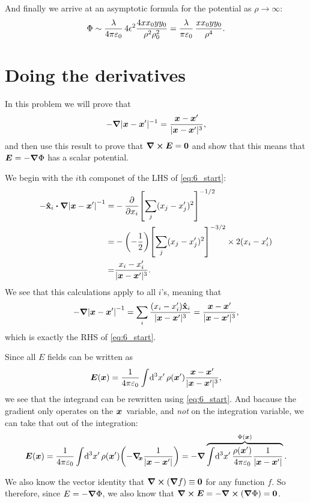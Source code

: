 \documentclass[11pt,letter, swedish, english
]{article}
\let\oldint\int
\renewcommand{\int}{\oldint\limits}
\newcommand{\enaught}{\ensuremath\varepsilon_0}
\begin{document}
And finally we arrive at an asymptotic formula for the potential as
$\rho\to\infty$:
\begin{equation}
\Phi\sim \frac{\lambda}{4\pi\enaught}\,
4\epsilon^2\frac{4xx_0yy_0}{\rho^2\rho_0^2}
=\frac{\lambda}{\pi\enaught}\,\frac{xx_0yy_0}{\rho^4}.
\end{equation}




\section{Doing the derivatives}
In this problem we will prove that
\begin{equation}\label{eq:6_start}
-\grad|\vb*x-\vb*x'|^{-1}
=\frac{\vb*x-\vb*x'}{|\vb*x-\vb*x'|^{3}},
\end{equation}
and then use this result to prove that $\curl\vb*E=\vb0$ and show that
this means that $\vb*E=-\grad\Phi$ has a scalar potential.

We begin with the $i$th componet of the LHS of \eqref{eq:6_start}:
\begin{equation}
\begin{aligned}
-\vu{x}_i\vdot\grad\qty|\vb*x-\vb*x'|^{-1}
=&-\pdv{x_i}\qty[\sum_j(x_j-x_j')^2]^{-1/2}\\
=&-\qty(-\frac{1}{2})\qty[\sum_j(x_j-x_j')^2]^{-3/2}
\times 2(x_i-x_i')\\
=&\frac{x_i-x_i'}{|\vb*x-\vb*x'|^3}.
\end{aligned}
\end{equation}
We see that this calculations apply to all $i$'s, meaning that
\begin{equation}
-\grad\qty|\vb*x-\vb*x'|^{-1}=
\sum_i\frac{(x_i-x_i')\vu{x}_i}{|\vb*x-\vb*x'|^3}
=\frac{\vb*x-\vb*x'}{|\vb*x-\vb*x'|^{3}},
\end{equation}
which is exactly the RHS of \eqref{eq:6_start}.

Since all $E$ fields can be written as 
\begin{equation}
\vb*E(\vb*x)=\frac{1}{4\pi\enaught}\int\!\rd^3x'\,
\rho(\vb*x') \frac{\vb*x-\vb*x'}{|\vb*x-\vb*x'|^{3}},
\end{equation}
we see that the integrand can be rewritten using
\eqref{eq:6_start}. And bacause the gradient only operates on the
$\vb*x$~variable, and \emph{not} on the integration variable, we can
take that out of the integration:
\begin{equation}
\vb*E(\vb*x)=\frac{1}{4\pi\enaught}\int\!\rd^3x'\,
\rho(\vb*x')\qty(-\grad_{\!\!\vb*x} \frac{1}{|\vb*x-\vb*x'|})
=-\grad \overbrace{\int\!\rd^3x'\,
\frac{\rho(\vb*x')}{4\pi\enaught}\frac{1}{|\vb*x-\vb*x'|}}^{\Phi(\vb*x)}.
\end{equation}

We also know the vector identity that $\curl(\grad f)\equiv\vb*0$ for
any function $f$. So therefore, since $E=-\grad\Phi$, we also know
that $\curl\vb*E=-\curl(\grad\Phi)=\vb*0$.
\end{document}
